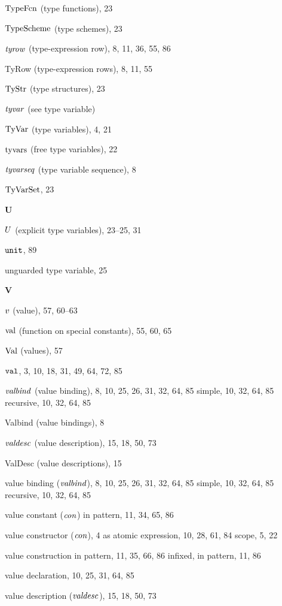 \begin{theindex}
\item ${\rm TypeFcn}$ (type functions), 23
\item ${\rm TypeScheme}$ (type schemes), 23
\item ${\it tyrow}$ (type-expression row), 8, 11, 36, 55, 86
\item TyRow (type-expression rows), 8, 11, 55
\item ${\rm TyStr}$ (type structures), 23
\item ${\it tyvar}$ (see type variable) 
\item ${\rm TyVar}$ (type variables), 4, 21
\item $\mathop{\rm tyvars}\nolimits$ (free type variables), 22
\item ${\it tyvarseq}$ (type variable sequence), 8
\item ${\rm TyVarSet}$, 23
\indexspace
\parbox{65mm}{\hfil{\large\bf U}\hfil}
\indexspace
\item $U$ (explicit type variables), 23--25, 31
\item $\mbox{\tt unit}$, 89
\item unguarded type variable, 25
\indexspace
\parbox{65mm}{\hfil{\large\bf V}\hfil}
\indexspace
\item $v$ (value), 57, 60--63
\item $\mathop{\rm val}\nolimits$ (function on special constants), 55, 60, 65
\item ${\rm Val}$ (values), 57
\item ${\tt val}$, 3, 10, 18, 31, 49, 64, 72, 85
\item ${\it valbind}$ (value binding), 8, 10, 25, 26, 31, 32, 64, 85
\subitem simple, 10, 32, 64, 85
\subitem recursive, 10, 32, 64, 85
\item Valbind (value bindings), 8
\item ${\it valdesc}$ (value description), 15, 18, 50, 73
\item ValDesc (value descriptions), 15
\item value binding (${\it valbind}$), 8, 10, 25, 26, 31, 32, 64, 85
\subitem simple, 10, 32, 64, 85
\subitem recursive, 10, 32, 64, 85
\item value constant (${\it con}$) 
\subitem in pattern, 11, 34, 65, 86
\item value constructor (${\it con}$), 4
\subitem as atomic expression, 10, 28, 61, 84
\subitem scope, 5, 22
\item value construction 
\subitem in pattern, 11, 35, 66, 86
\subitem infixed, in pattern, 11, 86
\item value declaration, 10, 25, 31, 64, 85
\item value description (${\it valdesc}$), 15, 18, 50, 73

\end{theindex}
